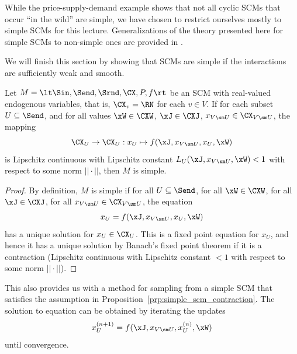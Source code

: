 While the price-supply-demand example shows that not all cyclic SCMs that occur ``in the wild'' are simple, we have chosen
to restrict ourselves mostly to simple SCMs for this lecture. Generalizations of the theory presented here for simple SCMs 
to non-simple ones are provided in \cite{BFPM21}.

We will finish this section by showing that SCMs are simple if the interactions are sufficiently weak and smooth.
\begin{Prp}\label{prp:simple_scm_contraction}
  Let $M = \lt \Sin, \Send, \Srnd, \CX, P, f \rt$ be an SCM with real-valued endogenous variables, that is, $\CX_v = \RN$ for each $v \in V$.
  If for each subset $U \subseteq \Send$, and for all values $\xW\in\CXW$, $\xJ \in \CXJ$, $x_{V\sm U} \in \CX_{V\sm U}$, the mapping
  \begin{equation*}
  \CX_U \to \CX_U : x_U \mapsto f(\xJ,x_{V\sm U},x_U,\xW)
  \end{equation*}
  is Lipschitz continuous with Lipschitz constant $L_U(\xJ,x_{V\sm U},\xW) < 1$ with respect to some norm $||\cdot||$, then $M$ is simple.
\end{Prp}
\begin{proof}
  By definition, $M$ is simple if for all $U \subseteq \Send$, for all $\xW\in\CXW$, for all $\xJ \in \CXJ$, for all $x_{V\sm U} \in \CX_{V\sm U}$, the equation
  \begin{equation}\label{eq:simple_scm_contraction}
    x_U = f(\xJ,x_{V\sm U},x_U,\xW)
  \end{equation}
  has a unique solution for $x_U\in\CX_U$.
  This is a fixed point equation for $x_U$, and hence it has a unique solution by Banach's fixed point theorem if it is a contraction (Lipschitz continuous with Lipschitz constant $<1$ with respect to some norm $||\cdot||$).
\end{proof}

\begin{Rem}
  This also provides us with a method for sampling from a simple SCM that satisfies the assumption in Proposition~\ref{prp:simple_scm_contraction}. The solution to equation  
can be obtained by iterating the updates
  $$x_U^{(n+1)} = f(\xJ,x_{V\sm U},x_U^{(n)},\xW)$$
until convergence.
\end{Rem}

